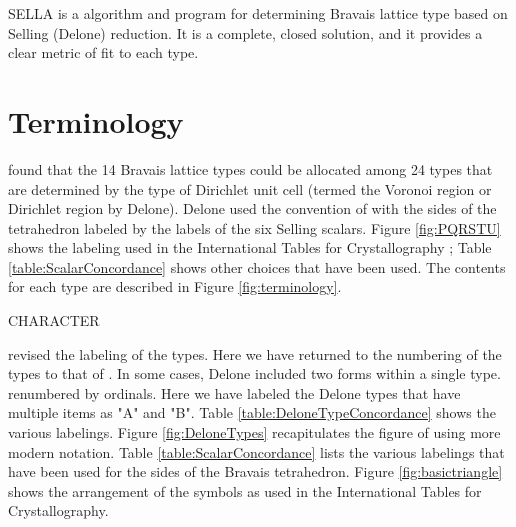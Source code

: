 \documentclass[preprint]{iucr}              %
\begin{document}
SELLA is a algorithm and program for determining Bravais lattice 
type based on Selling (Delone) reduction. It is a complete, closed solution, and it provides a clear metric of fit to each type.

\section{Terminology}

 found that the 14 Bravais lattice types 
could be allocated among 24 types that are determined by the 
type of Dirichlet unit cell (termed the Voronoi region \cite{Voronoi1908} or 
Dirichlet region \cite{dirichlet1850} by 
Delone). Delone used the convention of 
with the sides of the tetrahedron labeled by the labels of the six
Selling scalars. Figure \ref{fig:PQRSTU} shows the labeling used in
the International Tables for Crystallography \cite{Henry1952}; 
Table \ref{table:ScalarConcordance} shows other choices that have been used. The
 contents for each type are described in Figure \ref{fig:terminology}.

CHARACTER

 revised the labeling of the types.
Here we have returned to the numbering of the types to that 
of .
In some cases, Delone included two forms within a single 
type. 
renumbered by ordinals. Here we have labeled the Delone 
types that have multiple items as "A" and "B". Table \ref{table:DeloneTypeConcordance}
shows the various labelings. Figure \ref{fig:DeloneTypes} 
recapitulates the figure of  using 
more modern notation. Table \ref{table:ScalarConcordance} 
lists the various labelings that have been 
used for the sides of the Bravais tetrahedron. 
Figure \ref{fig:basictriangle} shows the arrangement of the 
symbols as used in the International Tables for Crystallography.
\end{document}
